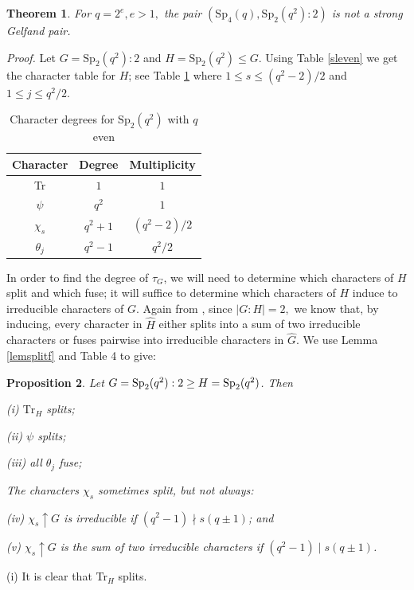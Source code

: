 \documentclass{amsart}
\newtheorem{thm}{Theorem}[section]
\newtheorem{prop}[thm]{Proposition}
\begin{document}
\begin{thm}
For $q=2^e, e>1,$ the pair $\left(\mathrm{Sp}_4(q), \mathrm{Sp}_2\left(q^2\right)\colon 2\right)$ is not a strong Gelfand pair.
\end{thm}
\noindent\textit{Proof.} Let $G=\mathrm{Sp}_2\left(q^2\right)\colon 2$ and $H = \mathrm{Sp}_2\left(q^2\right)\leq G$. Using  Table \ref{sleven} we get the character table for $H$; see  Table \ref{lineardegrees} where  $1 \leq s \leq (q^2-2)/2$ and $1 \leq j \leq q^2/2$.

\begin{table}[h!]
\centering
\caption{Character degrees for $\mathrm{Sp}_{2}\left(q^2\right)$ with $q$ even}
\vspace{5pt}
\label{lineardegrees}
\begin{tabular}{c|c c}
Character & Degree&Multiplicity\\
\hline
 Tr & $1$& $1$\\
$\psi$ & $q^2$& $1$\\
$\chi_s$ & $q^2+1$ & $(q^2-2)/2$\\
$\theta_j$ & $q^2-1$&$q^2/2$
\end{tabular}
\end{table}

In order to find the degree of $\tau_{G}$, we will need to determine which characters of $H$ split and which  fuse; 
it will suffice to determine which characters of $H$ induce to  irreducible characters of $G$. Again from \cite{JaL}, since $|G \colon H|=2,$ we know that, by  inducing, every character in $\hat{H}$ either splits into a sum of two irreducible characters or fuses pairwise into irreducible characters in $\hat{G}$.
We  use Lemma \ref {lemsplitf} and Table 4 to give:

 
\begin{prop}\label{propsplit} Let $G={\rm Sp}_2(q^2):2\ge H={\rm Sp}_2(q^2)$. Then 

\noindent (i) $\text{Tr}_H$ splits;

\noindent (ii)  $\psi$ splits;

\noindent (iii) all $\theta_j$ fuse;

 The characters $\chi_s$ sometimes split, but not always: 
 
\noindent (iv)  $\chi_s\uparrow G$ is  irreducible  if $(q^2-1)\nmid s(q\pm1)$; and 
 
 
 \noindent (v) $\chi_s\uparrow G$ is the sum of two irreducible characters if $(q^2-1) \mid s(q\pm1)$.
\end{prop}
 (i) It is clear that Tr$_H$ splits.
\end{document}
